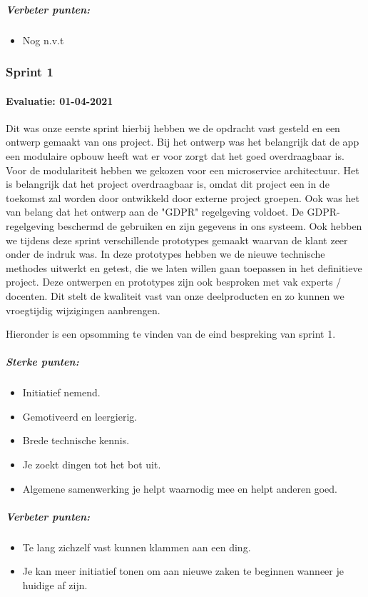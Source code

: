 \subparagraph{Verbeter punten:}
\begin{itemize}
	\setlength{\itemsep}{0pt}%
	\setlength{\parskip}{0pt}%
	\item Nog n.v.t
\end{itemize}


\subsubsection{Sprint 1}
\paragraph{Evaluatie: 01-04-2021}
Dit was onze eerste sprint hierbij hebben we de opdracht vast gesteld en een ontwerp gemaakt van ons project.
Bij het ontwerp was het belangrijk dat de app een modulaire opbouw heeft wat er voor zorgt dat het goed overdraagbaar is.
Voor de modulariteit hebben we gekozen voor een microservice architectuur.
Het is belangrijk dat het project overdraagbaar is, omdat dit project een in de toekomst zal worden door ontwikkeld door externe project groepen.
Ook was het van belang dat het ontwerp aan de "GDPR" regelgeving voldoet.
De GDPR-regelgeving beschermd de gebruiken en zijn gegevens in ons systeem.
Ook hebben we tijdens deze sprint verschillende prototypes gemaakt waarvan de klant zeer onder de indruk was.
In deze prototypes hebben we de nieuwe technische methodes uitwerkt en getest, die we laten willen gaan toepassen in het definitieve project.
Deze ontwerpen en prototypes zijn ook besproken met vak experts / docenten.
Dit stelt de kwaliteit vast van onze deelproducten en zo kunnen we vroegtijdig wijzigingen aanbrengen.

Hieronder is een opsomming te vinden van de eind bespreking van sprint 1.
\subparagraph{Sterke punten:}
\begin{itemize}
	\setlength{\itemsep}{0pt}%
	\setlength{\parskip}{0pt}%
	\item Initiatief nemend.
	\item Gemotiveerd en leergierig.
	\item Brede technische kennis.
	\item Je zoekt dingen tot het bot uit.
	\item Algemene samenwerking je helpt waarnodig mee en helpt anderen goed.
\end{itemize}

\subparagraph{Verbeter punten:}
\begin{itemize}
	\setlength{\itemsep}{0pt}%
	\setlength{\parskip}{0pt}%
	\item Te lang zichzelf vast kunnen klammen aan een ding.
	\item Je kan meer initiatief tonen om aan nieuwe zaken te beginnen wanneer je huidige af zijn.
\end{itemize}

